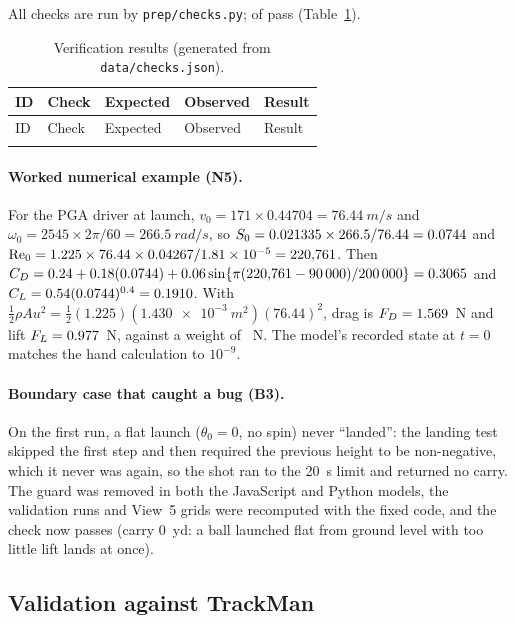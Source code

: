 \documentclass[11pt]{article}
\begin{document}
All checks are run by \texttt{prep/checks.py}; \NPass{} of \NChecks{} pass (Table~\ref{tab:checks}).

{\footnotesize
\begin{longtable}{@{}p{}p{}p{}p{}p{}@{}}
\caption{Verification results (generated from \texttt{data/checks.json}).}\label{tab:checks}\\
\toprule ID & Check & Expected & Observed & Result \\ \midrule \endfirsthead
\toprule ID & Check & Expected & Observed & Result \\ \midrule \endhead
{}{checks_table.tex}
\bottomrule
\end{longtable}}

\paragraph{Worked numerical example (N5).} For the PGA driver at launch,
$v_0=171\times0.44704=\SI{76.44}{m/s}$ and $\omega_0=2545\times2\pi/60=\SI{266.5}{rad/s}$, so
$S_0=0.021335\times266.5/76.44=0.0744$ and $\mathrm{Re}_0=1.225\times76.44\times0.04267/1.81\times10^{-5}=220{,}761$.
Then $C_D=0.24+0.18(0.0744)+0.06\sin\{\pi(220{,}761-\num{90000})/\num{200000}\}=0.3065$ and
$C_L=0.54(0.0744)^{0.4}=0.1910$. With $\tfrac12\rho A u^2 = \tfrac12(1.225)(\SI{1.430e-3}{m^2})(76.44)^2$,
drag is $F_D=1.569$~N and lift $F_L=0.977$~N, against a weight of \Wweight~N. The model's
recorded state at $t=0$ matches the hand calculation to $10^{-9}$.

\paragraph{Boundary case that caught a bug (B3).} On the first run, a flat launch
($\theta_0=0$, no spin) never ``landed'': the landing test skipped the first step and then required
the previous height to be non-negative, which it never was again, so the shot ran to the
\SI{20}{s} limit and returned no carry. The guard was removed in both the JavaScript and Python models,
the validation runs and View~5 grids were recomputed with the fixed code, and the check now passes
(carry \SI{0}{yd}: a ball launched flat from ground level with too little lift lands at once).

\subsection{Validation against TrackMan}
\end{document}
